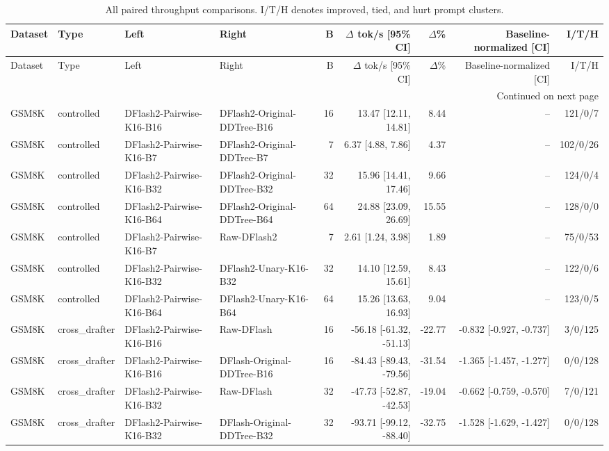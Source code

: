 \begin{longtable}{llllrrrrr}
\caption{All paired throughput comparisons. I/T/H denotes improved, tied, and hurt prompt clusters.}\label{tab:all-comparisons}\\
\toprule
Dataset & Type & Left & Right & B & $\Delta$ tok/s [95\% CI] & $\Delta$\% & Baseline-normalized [CI] & I/T/H \\
\midrule
\endfirsthead
\toprule
Dataset & Type & Left & Right & B & $\Delta$ tok/s [95\% CI] & $\Delta$\% & Baseline-normalized [CI] & I/T/H \\
\midrule
\endhead
\midrule
\multicolumn{9}{r}{Continued on next page}\\
\endfoot
\bottomrule
\endlastfoot
GSM8K & controlled & DFlash2-Pairwise-K16-B16 & DFlash2-Original-DDTree-B16 & 16 & 13.47 [12.11, 14.81] & 8.44 & -- & 121/0/7 \\
GSM8K & controlled & DFlash2-Pairwise-K16-B7 & DFlash2-Original-DDTree-B7 & 7 & 6.37 [4.88, 7.86] & 4.37 & -- & 102/0/26 \\
GSM8K & controlled & DFlash2-Pairwise-K16-B32 & DFlash2-Original-DDTree-B32 & 32 & 15.96 [14.41, 17.46] & 9.66 & -- & 124/0/4 \\
GSM8K & controlled & DFlash2-Pairwise-K16-B64 & DFlash2-Original-DDTree-B64 & 64 & 24.88 [23.09, 26.69] & 15.55 & -- & 128/0/0 \\
GSM8K & controlled & DFlash2-Pairwise-K16-B7 & Raw-DFlash2 & 7 & 2.61 [1.24, 3.98] & 1.89 & -- & 75/0/53 \\
GSM8K & controlled & DFlash2-Pairwise-K16-B32 & DFlash2-Unary-K16-B32 & 32 & 14.10 [12.59, 15.61] & 8.43 & -- & 122/0/6 \\
GSM8K & controlled & DFlash2-Pairwise-K16-B64 & DFlash2-Unary-K16-B64 & 64 & 15.26 [13.63, 16.93] & 9.04 & -- & 123/0/5 \\
GSM8K & cross\_drafter & DFlash2-Pairwise-K16-B16 & Raw-DFlash & 16 & -56.18 [-61.32, -51.13] & -22.77 & -0.832 [-0.927, -0.737] & 3/0/125 \\
GSM8K & cross\_drafter & DFlash2-Pairwise-K16-B16 & DFlash-Original-DDTree-B16 & 16 & -84.43 [-89.43, -79.56] & -31.54 & -1.365 [-1.457, -1.277] & 0/0/128 \\
GSM8K & cross\_drafter & DFlash2-Pairwise-K16-B32 & Raw-DFlash & 32 & -47.73 [-52.87, -42.53] & -19.04 & -0.662 [-0.759, -0.570] & 7/0/121 \\
GSM8K & cross\_drafter & DFlash2-Pairwise-K16-B32 & DFlash-Original-DDTree-B32 & 32 & -93.71 [-99.12, -88.40] & -32.75 & -1.528 [-1.629, -1.427] & 0/0/128 \\

\end{longtable}
